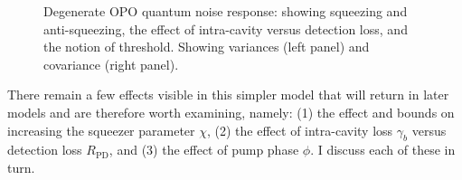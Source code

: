 \begin{figure}
	\centering
	\caption{Degenerate OPO quantum noise response: showing squeezing and anti-squeezing, the effect of intra-cavity versus detection loss, and the notion of threshold. Showing variances (left panel) and covariance (right panel).}
	\label{fig:dOPO_variances}
\end{figure}

There remain a few effects visible in this simpler model that will return in later models and are therefore worth examining, namely: (1) the effect and bounds on increasing the squeezer parameter $\chi$, (2) the effect of intra-cavity loss $\gamma_b$ versus detection loss $R_\text{PD}$, and (3) the effect of pump phase $\phi$. I discuss each of these in turn. %

